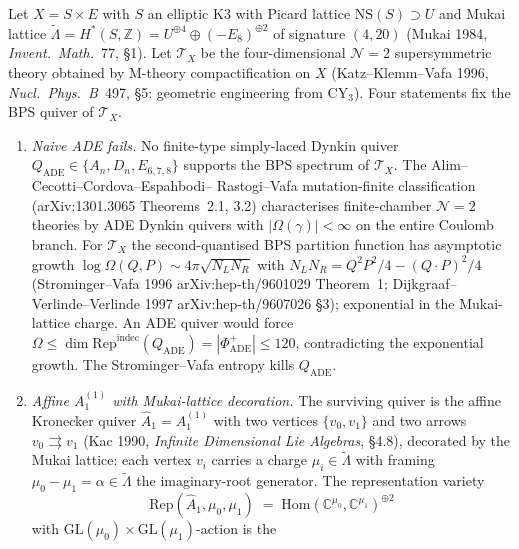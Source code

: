 \begin{proposition}
\label{prop:cy-c-beyond-k3e-bps-quiver-affine-a1-mukai-decoration}
Let $X=S\times E$ with $S$ an elliptic K3 with Picard lattice
$\mathrm{NS}(S)\supset U$ and Mukai lattice
$\widetilde\Lambda=H^*(S,\mathbb Z)=U^{\oplus 4}\oplus(-E_8)^{\oplus 2}$
of signature $(4,20)$
(Mukai 1984, \emph{Invent.\ Math.}~77, \S 1). Let $\mathcal T_X$ be
the four-dimensional $\mathcal N=2$ supersymmetric theory obtained
by M-theory compactification on $X$ (Katz--Klemm--Vafa 1996,
\emph{Nucl.\ Phys.\ B}~497, \S 5: geometric engineering from
CY$_3$). Four statements fix the BPS quiver of $\mathcal T_X$.
\begin{enumerate}
\item \emph{Naive ADE fails.} No finite-type simply-laced Dynkin
quiver $Q_{\mathrm{ADE}}\in\{A_n,D_n,E_{6,7,8}\}$ supports the BPS
spectrum of $\mathcal T_X$. The Alim--Cecotti--Cordova--Espahbodi--
Rastogi--Vafa mutation-finite classification (arXiv:1301.3065
Theorems~2.1, 3.2) characterises finite-chamber $\mathcal N=2$
theories by ADE Dynkin quivers with $|\Omega(\gamma)|<\infty$ on the
entire Coulomb branch. For $\mathcal T_X$ the second-quantised BPS
partition function has asymptotic growth
$\log\Omega(Q,P)\sim 4\pi\sqrt{N_L N_R}$ with
$N_L N_R=Q^2 P^2/4 -(Q\cdot P)^2/4$ (Strominger--Vafa 1996
arXiv:hep-th/9601029 Theorem~1; Dijkgraaf--Verlinde--Verlinde 1997
arXiv:hep-th/9607026 \S 3); exponential in the Mukai-lattice
charge. An ADE quiver would force
$\Omega\le\dim\mathrm{Rep}^{\mathrm{indec}}(Q_{\mathrm{ADE}})
=|\Phi^+_{\mathrm{ADE}}|\le 120$, contradicting the exponential
growth. The Strominger--Vafa entropy kills $Q_{\mathrm{ADE}}$.
\item \emph{Affine $A_1^{(1)}$ with Mukai-lattice decoration.}
The surviving quiver is the affine Kronecker quiver
$\widehat A_1=A_1^{(1)}$ with two vertices $\{v_0,v_1\}$ and two
arrows $v_0\rightrightarrows v_1$ (Kac 1990, \emph{Infinite
Dimensional Lie Algebras}, \S 4.8), decorated by the Mukai lattice:
each vertex $v_i$ carries a charge $\mu_i\in\widetilde\Lambda$
with framing $\mu_0-\mu_1=\alpha\in\widetilde\Lambda$ the
imaginary-root generator. The representation variety
\[
 \mathrm{Rep}(\widehat A_1,\mu_0,\mu_1)
 \;=\; \mathrm{Hom}(\mathbb C^{\mu_0},\mathbb C^{\mu_1})^{\oplus 2}
\]
with $\mathrm{GL}(\mu_0)\times\mathrm{GL}(\mu_1)$-action is the

\end{enumerate}
\end{proposition}
